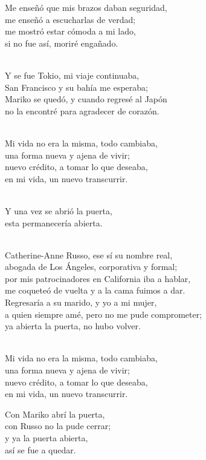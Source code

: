 \begin{lyrics}
Me enseñó que mis brazos daban seguridad,\\
me enseñó a escucharlas de verdad;\\
me mostró estar cómoda a mi lado,\\
si no fue así, moriré engañado.

\\
Y se fue Tokio, mi viaje continuaba,\\
San Francisco y su bahía me esperaba;\\
Mariko se quedó, y cuando regresé al Japón\\
no la encontré para agradecer de corazón.

\\
Mi vida no era la misma, todo cambiaba,\\
una forma nueva y ajena de vivir;\\
nuevo crédito, a tomar lo que deseaba,\\
en mi vida, un nuevo transcurrir.

\\
Y una vez se abrió la puerta,\\
esta permanecería abierta.

\\
Catherine-Anne Russo, ese sí su nombre real,\\
abogada de Los Ángeles, corporativa y formal;\\
por mis patrocinadores en California iba a hablar,\\
me coqueteó de vuelta y a la cama fuimos a dar.\\
Regresaría a su marido, y yo a mi mujer,\\
a quien siempre amé, pero no me pude comprometer;\\
ya abierta la puerta, no hubo volver.

\\
Mi vida no era la misma, todo cambiaba,\\
una forma nueva y ajena de vivir;\\
nuevo crédito, a tomar lo que deseaba,\\
en mi vida, un nuevo transcurrir.

Con Mariko abrí la puerta,\\
con Russo no la pude cerrar;\\
y ya la puerta abierta,\\
así se fue a quedar.
\end{lyrics}

